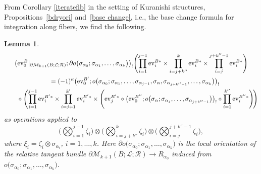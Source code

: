 \documentclass[pdftex]{sigma}
\numberwithin{equation}{section}
\newtheorem{lem}[thm]{Lemma}
\theoremstyle{definition}
\begin{document}
From Corollary \ref{iteratefib} in the setting of Kuranishi structures, Propositions~\ref{bdryori} and~\ref{base change}, i.e., the base change formula for
integration along fibers, we find the following.

\begin{lem}\label{compformula}
\begin{gather*}
\bigl( {\rm ev}_0^B \vert_{\partial {\mathcal M}_{k+1}(B;{\mathcal L};{\mathcal R})}; \partial o\bigl(\sigma_{\alpha_0};\sigma_{\alpha_1}, \dots, \sigma_{\alpha_k}\bigr) \bigr)_!
\Biggl(\prod_{i=1}^{j-1} {\rm ev}_i^{B*} \times \prod_{i=j+k''}^k {\rm ev}_i^{B*} \times \prod_{i=j}^{j+k''-1}{\rm ev}_i^{B*} \Biggr) \\
\quad{} = (-1)^{\kappa} \bigl( {\rm ev}_0^{B'};o\bigl(\sigma_{\alpha_0}; \sigma_{\alpha_1}, \dots, \sigma_{\alpha_{j-1}}, \sigma_{\alpha}, \sigma_{\alpha_{j+k''-1}}, \dots, \sigma_{\alpha_k}\bigr) \bigr)_!  \\
\qquad{} \circ \Biggl( \prod_{i=1}^{j-1} {\rm ev}_i^{B'*} \times \prod_{i=j+1}^{k'} {\rm ev}_i^{B'*} \times \Biggl( {\rm ev}_j^{B'*} \circ \bigl({\rm ev}_0^{B''}; o\bigl(\sigma_{\alpha}; \sigma_{\alpha_j}, \dots,
\sigma_{\alpha_{j+k''-1}}\bigr) \bigr)_! \circ \prod_{i=1}^{k''}{\rm ev}_i^{B''*} \Biggl)\! \Biggr)
\end{gather*}
as operations applied to
\[
\Biggl(\bigotimes_{i=1}^{j-1} \zeta_i\Biggr) \otimes \Biggl(\bigotimes_{i=j+k''}^k \zeta_i\Biggr) \otimes \Biggl(\bigotimes_{i=j}^{j+ k''-1} \zeta_i\Biggr),
\]
where
$\xi_i=\zeta_i \otimes \sigma_{\alpha_i}$, $i=1, \dots, k$.
Here $\partial o\bigl(\sigma_{\alpha_0};\sigma_{\alpha_1}, \dots, \sigma_{\alpha_k}\bigr)$ is the local orientation of the relative tangent bundle
$\partial {\mathcal M}_{k+1}(B;{\mathcal L}; {\mathcal R}) \to R_{\alpha_0}$ induced from
$o\bigl(\sigma_{\alpha_0};\sigma_{\alpha_1}, \dots, \sigma_{\alpha_k}\bigr)$.
\end{lem}
\end{document}
